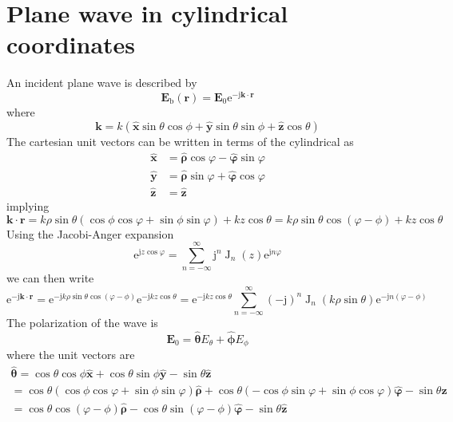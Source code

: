 \documentclass[a4paper,12pt]{article}
\renewcommand{\vec}[1]{\boldsymbol{#1}}
\newcommand{\unitvec}[1]{\hat{\vec{#1}}}
\newcommand{\mrm}[1]{\mathrm{#1}}
\newcommand{\ju}{\mrm{j}}
\newcommand{\eu}{\mrm{e}}
\newcommand{\Ev}{\vec{E}}
\newcommand{\rv}{\vec{r}}
\newcommand{\kv}{\vec{k}}
\newcommand{\xuv}{\unitvec{x}}
\newcommand{\yuv}{\unitvec{y}}
\newcommand{\zuv}{\unitvec{z}}
\newcommand{\rhouv}{\unitvec{\rho}}
\newcommand{\varphiuv}{\unitvec{\varphi}}
\newcommand{\thetauv}{\unitvec{\theta}}
\newcommand{\phiuv}{\unitvec{\phi}}
\newcommand{\BesselJ}{\operatorname{J}}
\begin{document}
\section{Plane wave in cylindrical coordinates}
\label{sec:planewave}

An incident plane wave is described by
\begin{equation}
  \Ev_{\mrm{b}}(\rv) = \Ev_{0}\eu^{-\ju\kv\cdot\rv}
\end{equation}
where
\begin{equation}
  \kv = k(\xuv\sin\theta\cos\phi + \yuv\sin\theta\sin\phi + \zuv\cos\theta)
\end{equation}
The cartesian unit vectors can be written in terms of the cylindrical as
\begin{align}
  \xuv &= \rhouv\cos\varphi - \varphiuv\sin\varphi \\
  \yuv &= \rhouv\sin\varphi + \varphiuv\cos\varphi \\
  \zuv &= \zuv
\end{align}
implying
\begin{equation}
  \kv\cdot\rv = k\rho\sin\theta(\cos\phi\cos\varphi + \sin\phi\sin\varphi) + kz\cos\theta 
  = k\rho\sin\theta\cos(\varphi-\phi) + kz\cos\theta
\end{equation}
Using the Jacobi-Anger expansion
\begin{equation}
  \eu^{\ju z\cos\varphi} = \sum_{n=-\infty}^{\infty}\ju^{n}\BesselJ_{n}(z)\eu^{\ju n\varphi}
\end{equation}
we can then write
\begin{equation}
  \eu^{-\ju\kv\cdot\rv} = \eu^{-\ju k\rho\sin\theta\cos(\varphi-\phi)}\eu^{-\ju kz\cos\theta} = \eu^{-\ju kz\cos\theta} \sum_{n=-\infty}^{\infty}(-\ju)^{n}\BesselJ_{n}(k\rho\sin\theta)\eu^{-\ju n(\varphi-\phi)}
\end{equation}
The polarization of the wave is
\begin{equation}
  \Ev_{0} = \thetauv E_{\theta} + \phiuv E_{\phi}
\end{equation}
where the unit vectors are
\begin{multline}
  \thetauv = \cos\theta\cos\phi\xuv + \cos\theta\sin\phi\yuv - \sin\theta\zuv \\
  = \cos\theta(\cos\phi\cos\varphi + \sin\phi\sin\varphi)\rhouv + \cos\theta(-\cos\phi\sin\varphi + \sin\phi\cos\varphi)\varphiuv - \sin\theta\zuv \\
  = \cos\theta\cos(\varphi-\phi)\rhouv - \cos\theta\sin(\varphi-\phi)\varphiuv - \sin\theta\zuv
\end{multline}
\end{document}
